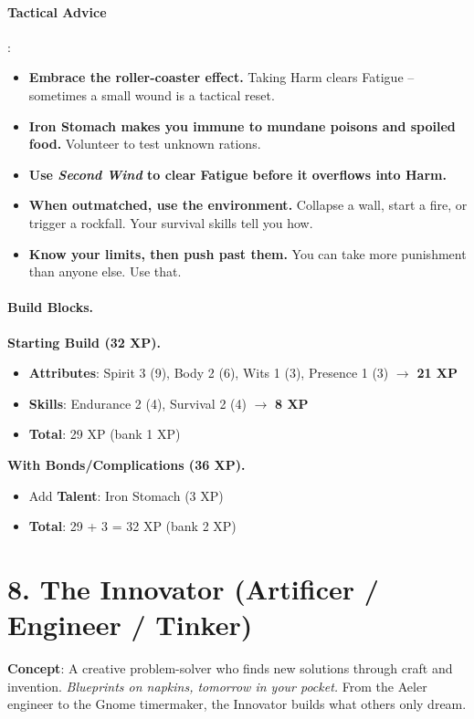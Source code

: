 \paragraph{Tactical Advice}:
\begin{itemize}
\item \textbf{Embrace the roller-coaster effect.} Taking Harm clears Fatigue -- sometimes a small wound is a tactical reset.
\item \textbf{Iron Stomach makes you immune to mundane poisons and spoiled food.} Volunteer to test unknown rations.
\item \textbf{Use \emph{Second Wind} to clear Fatigue before it overflows into Harm.}
\item \textbf{When outmatched, use the environment.} Collapse a wall, start a fire, or trigger a rockfall. Your survival skills tell you how.
\item \textbf{Know your limits, then push past them.} You can take more punishment than anyone else. Use that.
\end{itemize}

\paragraph{Build Blocks.}
\textbf{Starting Build (32 XP).}
\begin{itemize}
\item \textbf{Attributes}: Spirit 3 (9), Body 2 (6), Wits 1 (3), Presence 1 (3) \(\rightarrow\) \textbf{21 XP}
\item \textbf{Skills}: Endurance 2 (4), Survival 2 (4) \(\rightarrow\) \textbf{8 XP}
\item \textbf{Total}: 29 XP (bank 1 XP)
\end{itemize}
\textbf{With Bonds/Complications (36 XP).}
\begin{itemize}
\item Add \textbf{Talent}: Iron Stomach (3 XP)
\item \textbf{Total}: 29 + 3 = 32 XP (bank 2 XP)
\end{itemize}

\section{8. The Innovator (Artificer / Engineer / Tinker)}
\label{sec:concept-innovator}

\textbf{Concept}: A creative problem-solver who finds new solutions through craft and invention. \emph{Blueprints on napkins, tomorrow in your pocket.} From the Aeler engineer to the Gnome timermaker, the Innovator builds what others only dream.

